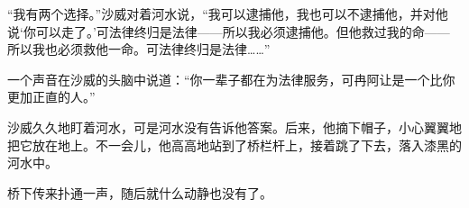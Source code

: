 \switchcolumn

“我有两个选择。”沙威对着河水说，“我可以逮捕他，我也可以不逮捕他，并对他说‘你可以走了。’可法律终归是法律——所以我必须逮捕他。但他救过我的命——所以我也必须救他一命。可法律终归是法律……”

\switchcolumn

一个声音在沙威的头脑中说道：“你一辈子都在为法律服务，可冉阿让是一个比你更加正直的人。”

\switchcolumn

沙威久久地盯着河水，可是河水没有告诉他答案。后来，他摘下帽子，小心翼翼地把它放在地上。不一会儿，他高高地站到了桥栏杆上，接着跳了下去，落入漆黑的河水中。

\switchcolumn

桥下传来扑通一声，随后就什么动静也没有了。
